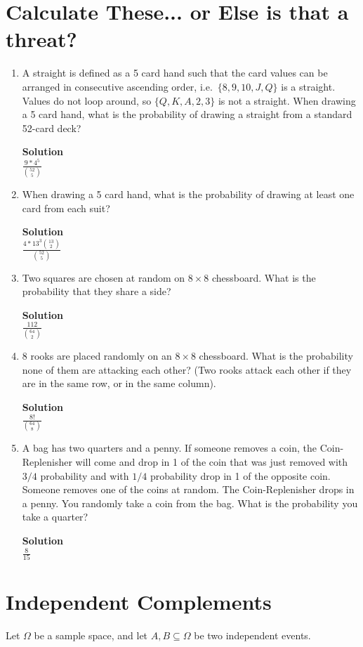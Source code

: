 \documentclass[11pt]{article}
\newcommand*{\Question}[1]{\section{#1}}
\newenvironment{Parts}{\begin{enumerate}[label=(\alph*)]}{\end{enumerate}}
\newcommand*{\Part}{\item}
\newenvironment{Answer}{\vspace{10pt}\begin{mdframed}\textbf{Solution}\\}{\end{mdframed}\vfill\pagebreak[3]}
\newenvironment{Answer}{\vspace{10pt}}{\vfill\pagebreak[3]}
\begin{document}
\Question{Calculate These... or Else is that a threat?}

\begin{Parts}

\Part 
A straight is defined as a 5 card hand such that the card values can be arranged in consecutive ascending order, i.e.\ $\{8,9,10,J,Q\}$ is a straight. Values do not loop around, so $\{Q, K, A, 2, 3\}$ is not a straight. When drawing a 5 card hand, what is the probability of drawing a straight from a standard 52-card deck?
\begin{Answer}
$\frac{9*4^5}{\binom{52}{5}}$
\end{Answer}

\Part
When drawing a 5 card hand, what is the probability of drawing at least one card from each suit?
\begin{Answer}
 $\frac{4*13^3\binom{13}{2}}{\binom{52}{5}}$
\end{Answer}

\Part 
Two squares are chosen at random on $8\times 8$ chessboard. What is the probability that they share a side?
\begin{Answer}
$\frac{112}{\binom{64}{2}}$
\end{Answer}

\Part 
8 rooks are placed randomly on an $8\times 8$ chessboard. What is the probability none of them are attacking each other? (Two rooks attack each other if they are in the same row, or in the same column).
\begin{Answer}
$\frac{8!}{\binom{64}{8}}$
\end{Answer}

\Part A bag has two quarters and a penny. If someone removes a coin, the Coin-Replenisher will come and drop in 1 of the coin that was just removed with $3/4$ probability and with $1/4$ probability drop in 1 of the opposite coin. Someone removes one of the coins at random. The Coin-Replenisher drops in a penny. You randomly take a coin from the bag. What is the probability you take a quarter?
\begin{Answer}
$\frac{8}{15}$
\end{Answer}

\end{Parts}


\Question{Independent Complements}

Let $\Omega$ be a sample space, and let $A,B \subseteq \Omega$ be two independent events.
\end{document}
